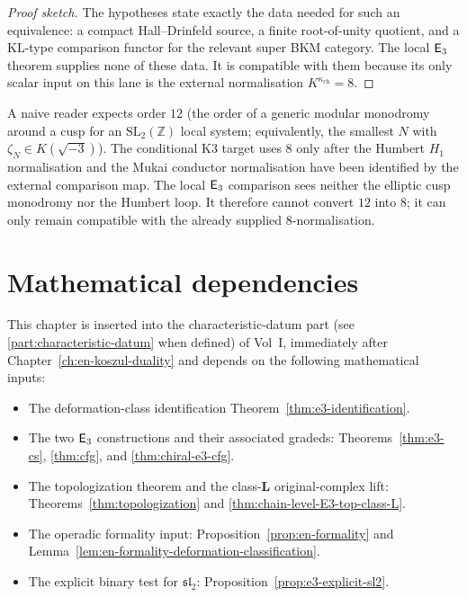 \begin{proof}[Proof sketch]
The hypotheses state exactly the data needed for such an equivalence:
a compact Hall--Drinfeld source, a finite root-of-unity quotient, and
a KL-type comparison functor for the relevant super BKM category. The
local $\mathsf{E}_3$ theorem supplies none of these data. It is compatible
with them because its only scalar input on this lane is the external
normalisation $K^{\kappa_{\mathrm{ch}}}=8$.
\end{proof}

\begin{remark}
\label{rem:why-eight-not-twelve}
A naive reader expects order $12$ (the order of a generic modular
monodromy around a cusp for an $\mathrm{SL}_2(\mathbb{Z})$ local
system; equivalently, the smallest $N$ with $\zeta_N \in K(\sqrt{-3})$).
The conditional K3 target uses $8$ only after the Humbert
$H_1$ normalisation and the Mukai conductor normalisation have been
identified by the external comparison map. The local $\mathsf{E}_3$
comparison sees neither the elliptic cusp monodromy nor the Humbert
loop. It therefore cannot convert $12$ into $8$; it can only remain
compatible with the already supplied $8$-normalisation.
\end{remark}

\section*{Mathematical dependencies}
\label{sec:e3-chain-level-cross-refs}

This chapter is inserted into the characteristic-datum part
(see \ref{part:characteristic-datum} when defined) of Vol~I,
immediately after
Chapter~\ref{ch:en-koszul-duality}
and depends on the following mathematical inputs:

\begin{itemize}
\item The deformation-class identification
Theorem~\ref{thm:e3-identification}.
\item The two $\mathsf{E}_3$ constructions and their associated gradeds:
Theorems~\ref{thm:e3-cs}, \ref{thm:cfg}, and
\ref{thm:chiral-e3-cfg}.
\item The topologization theorem and the class-$\mathbf L$
original-complex lift:
Theorems~\ref{thm:topologization} and
\ref{thm:chain-level-E3-top-class-L}.
\item The operadic formality input:
Proposition~\ref{prop:en-formality} and
Lemma~\ref{lem:en-formality-deformation-classification}.
\item The explicit binary test for $\mathfrak{sl}_2$:
Proposition~\ref{prop:e3-explicit-sl2}.
\end{itemize}

\endinput
